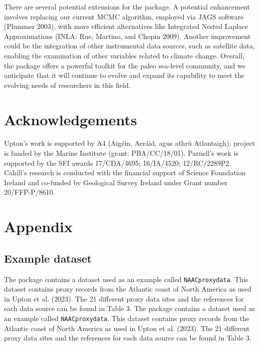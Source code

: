 There are several potential extensions for the  package. A potential enhancement involves replacing our current MCMC algorithm, employed via JAGS software (Plummer 2003), with more efficient alternatives like Integrated Nested Laplace Approximations (INLA: Rue, Martino, and Chopin 2009). Another improvement could be the integration of other instrumental data sources, such as satellite data, enabling the examination of other variables related to climate change. Overall, the  package offers a powerful toolkit for the paleo sea-level community, and we anticipate that it will continue to evolve and expand its capability to meet the evolving needs of researchers in this field.

\hypertarget{acknowledgements}{%
\section{Acknowledgements}\label{acknowledgements}}

Upton's work is supported by A4 (Aigéin, Aeráid, agus athrú Atlantaigh); project is funded by the Marine Institute (grant: PBA/CC/18/01). Parnell's work is supported by the SFI awards 17/CDA/4695; 16/IA/4520; 12/RC/2289P2. Cahill's research is conducted with the financial support of Science Foundation Ireland and co-funded by Geological Survey Ireland under Grant number 20/FFP-P/8610.

\hypertarget{appendix}{%
\section{Appendix}\label{appendix}}

\hypertarget{exampledatasetappendix}{%
\subsection{Example dataset}\label{exampledatasetappendix}}

The  package contains a dataset used as an example called \texttt{NAACproxydata}. This dataset contains proxy records from the Atlantic coast of North America as used in Upton et al. (2023). The 21 different proxy data sites and the references for each data source can be found in Table 3. The  package contains a dataset used as an example called \texttt{NAACproxydata}. This dataset contains proxy records from the Atlantic coast of North America as used in Upton et al. (2023). The 21 different proxy data sites and the references for each data source can be found in Table 3.


